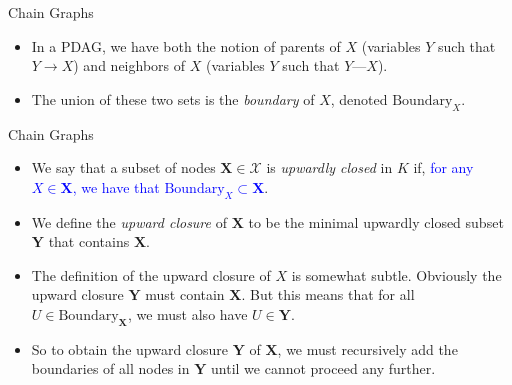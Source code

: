 \documentclass[11pt]{beamer}
\begin{document}
\begin{frame}{Chain Graphs}
\begin{itemize}
	\item In a PDAG, we have both the notion of parents of $X$ (variables
	$Y$ such that $Y \rightarrow X$) and neighbors of $X$ (variables $Y$
	such that $Y \text{---} X$).
	\item The union of these two sets is the \emph{boundary} of $X$, denoted
	$\text{Boundary}_{X}$.
\end{itemize}
\end{frame}

\begin{frame}{Chain Graphs}
\begin{itemize}
	\item We say that a subset of nodes $\boldsymbol{X} \in \mathcal{X}$ is
	\emph{upwardly closed} in $K$ if, \textcolor{blue}{for any $X \in
	\boldsymbol{X}$, we have that $\text{Boundary}_{X} \subset
	\boldsymbol{X}$}.
	\item We define the \emph{upward closure} of $\boldsymbol{X}$ to be the
	minimal upwardly closed subset $\boldsymbol{Y}$ that contains
	$\boldsymbol{X}$.
	\item The definition of the upward closure of $X$ is somewhat subtle.
	Obviously the upward closure $\boldsymbol{Y}$ must contain
	$\boldsymbol{X}$. But this means that for all $U \in
	\text{Boundary}_{\boldsymbol{X}}$, we must also have $U \in
	\boldsymbol{Y}$.
	\item So to obtain the upward closure $\boldsymbol{Y}$ of
	$\boldsymbol{X}$, we must recursively add the boundaries of all nodes in
	$\boldsymbol{Y}$ until we cannot proceed any further.
\end{itemize}
\end{frame}

\newcommand{\upwardclosure}
{%
	\subfloat[][(a)]
	{%
		\begin{tikzpicture}
		\scriptsize
		\node[darkstyle] (a) at (-1.5,1.1) {$A$};
		\node[darkstyle] (c) at (-1.5,0) {$C$};
		\node[darkstyle] (d) at (0,0) {$D$};
		\node[darkstyle] (e) at (1.5,0) {$E$};
		\node[darkstyle] (b) at (1.5,1.1) {$B$};
		\node[darkstyle] (f) at (-1.5,-1.5) {$F$};
		\node[darkstyle] (g) at (0,-1.5) {$G$};
		\node[darkstyle] (i) at (1.5,-1.5) {$I$};
		\node[darkstyle] (h) at (3.0,0) {$H$};
		\draw[-stealth] (a)--(c);
		\draw[-stealth] (b)--(e);
		\draw[-stealth] (c)--(i);
		\draw[-stealth] (h)--(i);
		\draw[-stealth] (c)--(f);
		\draw[-stealth] (d)--(g);
		\draw[-stealth] (e)--(i);
		\draw (c)--(d);
		\draw (d)--(e);
		\draw (f)--(g);
		\end{tikzpicture}
	}%
	\hspace{0.7cm}
	\subfloat[][(b)]
	{%
		\begin{tikzpicture}
		\scriptsize
		\node[darkstyle] (a) at (-1.5,1.1) {$A$};
		\node[darkstyle] (c) at (-1.5,0) {$C$};
		\node[darkstyle] (d) at (0,0) {$D$};
		\node[darkstyle] (e) at (1.5,0) {$E$};
		\node[darkstyle] (b) at (1.5,1.1) {$B$};
		\draw[-stealth] (a)--(c);
		\draw[-stealth] (b)--(e);
		\draw (c)--(d);
		\draw (d)--(e);
		\end{tikzpicture}
	}
}
\end{document}
